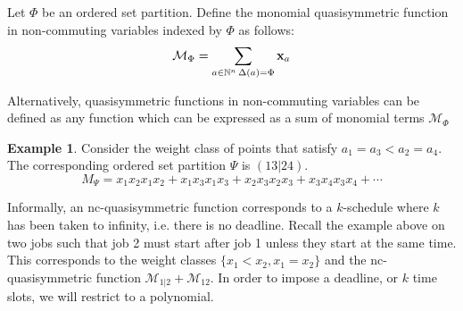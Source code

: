 \documentclass[12pt,reqno]{amsart}
\numberwithin{definition}{section}
\theoremstyle{definition}
\newtheorem{example}[definition]{Example}
\newcommand{\ncM}{\mathcal{M}}
\begin{document}
Let $\Phi$ be an ordered set partition.  Define the monomial quasisymmetric function in non-commuting variables indexed by $\Phi$ as follows:
$$\ncM_{\Phi} = \sum_{a \in \mathbb{N}^n \, \Delta(a) = \Phi} {\bf{x}}_{a}$$

Alternatively, quasisymmetric functions in non-commuting variables can be defined as any function which can be expressed as a sum of monomial terms $\ncM_{\Phi}$



\begin{example}

Consider the weight class of  points that satisfy $a_1 = a_3 < a_2 = a_4$.  The corresponding ordered set partition $\Psi$ is $(13|24)$.  
$$M_{\Psi} = x_1x_2x_1x_2 + x_1x_3x_1x_3 + x_2x_3x_2x_3 + x_3x_4x_3x_4 + \cdots$$  

\end{example}


Informally, an nc-quasisymmetric function corresponds to a
$k$-schedule where $k$ has been taken to infinity, i.e. there is no
deadline.  Recall the example above on two jobs such that job 2 must
start after job 1 unless they start at the same time.  This
corresponds to the weight classes $\{x_1 < x_2, x_1 = x_2\}$ and the
nc-quasisymmetric function $\ncM_{1|2} + \ncM_{12}$.  In order to
impose a deadline, or $k$ time slots, we will restrict to a
polynomial.
\end{document}
